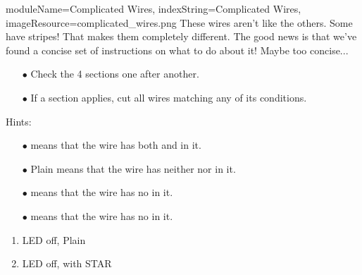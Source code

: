 \begin{module}{
  moduleName=Complicated Wires,
  indexString=Complicated Wires,
  imageResource=complicated_wires.png
}
{
  These wires aren't like the others. Some have stripes! That makes them completely different. The good news is that we've found a concise set of instructions on what to do about it! Maybe too concise...
}

\newlength{\cellwidth}
\newlength{\cellheight}
\newlength{\cellheightwithoutpadding}
\setlength{\cellwidth}{1cm}
\setlength{\cellheight}{1.13cm}
\setlength{\cellheightwithoutpadding}{1cm}
\newlength{\lastcellwidth}
\setlength{\lastcellwidth}{2.1cm}
\newlength{\fivecellwidth}
\setlength{\fivecellwidth}{5.69cm}
\newlength{\twocellheight}
\setlength{\twocellheight}{2\cellheight}
\newlength{\circleoffset}
\setlength{\circleoffset}{0.20\cellwidth}
\newlength{\staroffset}
\setlength{\staroffset}{0.05\cellwidth}
\newlength{\tablelinewidth}
\setlength{\tablelinewidth}{1pt}

\begin{itemize}
  \item[$\bullet$] Check the 4 sections one after another.
  \item[$\bullet$] If a section applies, cut all wires matching any of its conditions.
\end{itemize}

Hints:
\begin{itemize}
  \item[$\bullet$] \PURPLE means that the wire has both \RED and \BLUE in it.
  \item[$\bullet$] Plain \WHITE means that the wire has neither \RED nor \BLUE in it.
  \item[$\bullet$] \RED means that the wire has no \BLUE in it.
  \item[$\bullet$] \BLUE means that the wire has no \RED in it.
\end{itemize}

\vspace{2cm}

\begin{minipage}[t]{0.48\textwidth}
\begin{enumerate}
  \renewcommand{\labelenumi}{\alph{enumi}.}
  \item LED off, Plain \WHITE
  \item LED off, \RED with STAR
\end{enumerate}


\end{minipage}
\end{module}
